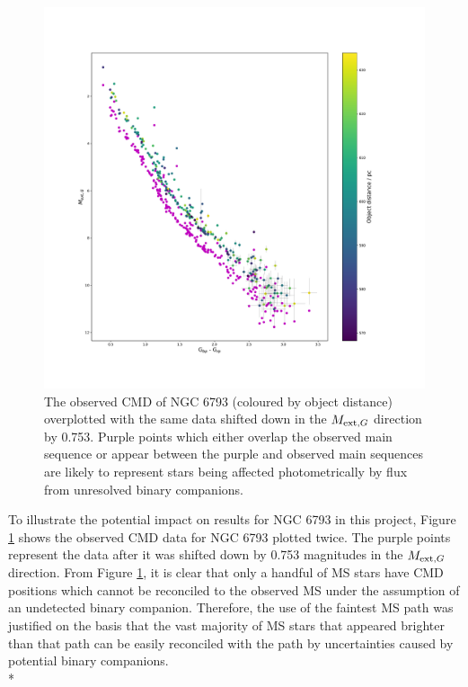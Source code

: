 \documentclass[12pt, a4paper]{report}
\begin{document}
\begin{figure}[h!]
\begin{center}
\includegraphics[width=1.0\textwidth]{../NGC_6793_CMD_Myr_binary_check_vizier.pdf}
\caption{The observed CMD of NGC 6793 (coloured by object distance) overplotted with the same data shifted down in the $M_{\textnormal{ext},G}$ direction by 0.753. Purple points which either overlap the observed main sequence or appear between the purple and observed main sequences are likely to represent stars being affected photometrically by flux from unresolved binary companions.}
\label{NGC_6793_binary}
\end{center}
\end{figure}

To illustrate the potential impact on results for NGC 6793 in this project, Figure \ref{NGC_6793_binary} shows the observed CMD data for NGC 6793 plotted twice. The purple points represent the data after it was shifted down by 0.753 magnitudes in the $M_{\textnormal{ext},G}$ direction. From Figure \ref{NGC_6793_binary}, it is clear that only a handful of MS stars have CMD positions which cannot be reconciled to the observed MS under the assumption of an undetected binary companion. Therefore, the use of the faintest MS path was justified on the basis that the vast majority of MS stars that appeared brighter than that path can be easily reconciled with the path by uncertainties caused by potential binary companions.\\*
\end{document}
